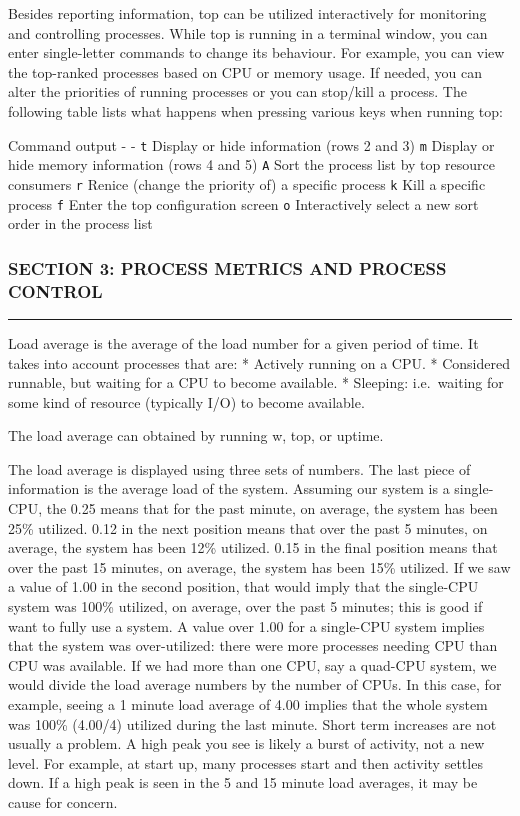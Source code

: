 Besides reporting information, top can be utilized interactively for
monitoring and controlling processes. While top is running in a terminal
window, you can enter single-letter commands to change its behaviour.
For example, you can view the top-ranked processes based on CPU or
memory usage. If needed, you can alter the priorities of running
processes or you can stop/kill a process. The following table lists what
happens when pressing various keys when running top:

Command \textbar{} output - \textbar{} - \texttt{t} \textbar{} Display
or hide information (rows 2 and 3) \texttt{m} \textbar{} Display or hide
memory information (rows 4 and 5) \texttt{A} \textbar{} Sort the process
list by top resource consumers \texttt{r} \textbar{} Renice (change the
priority of) a specific process \texttt{k} \textbar{} Kill a specific
process \texttt{f} \textbar{} Enter the top configuration screen
\texttt{o} \textbar{} Interactively select a new sort order in the
process list

\subsubsection{SECTION 3: PROCESS METRICS AND PROCESS
CONTROL}\label{section-3-process-metrics-and-process-control}

\begin{center}\rule{3in}{0.4pt}\end{center}

Load average is the average of the load number for a given period of
time. It takes into account processes that are: * Actively running on a
CPU. * Considered runnable, but waiting for a CPU to become available. *
Sleeping: i.e.~waiting for some kind of resource (typically I/O) to
become available.

The load average can obtained by running w, top, or uptime.

The load average is displayed using three sets of numbers. The last
piece of information is the average load of the system. Assuming our
system is a single-CPU, the 0.25 means that for the past minute, on
average, the system has been 25\% utilized. 0.12 in the next position
means that over the past 5 minutes, on average, the system has been 12\%
utilized. 0.15 in the final position means that over the past 15
minutes, on average, the system has been 15\% utilized. If we saw a
value of 1.00 in the second position, that would imply that the
single-CPU system was 100\% utilized, on average, over the past 5
minutes; this is good if want to fully use a system. A value over 1.00
for a single-CPU system implies that the system was over-utilized: there
were more processes needing CPU than CPU was available. If we had more
than one CPU, say a quad-CPU system, we would divide the load average
numbers by the number of CPUs. In this case, for example, seeing a 1
minute load average of 4.00 implies that the whole system was 100\%
(4.00/4) utilized during the last minute. Short term increases are not
usually a problem. A high peak you see is likely a burst of activity,
not a new level. For example, at start up, many processes start and then
activity settles down. If a high peak is seen in the 5 and 15 minute
load averages, it may be cause for concern.

